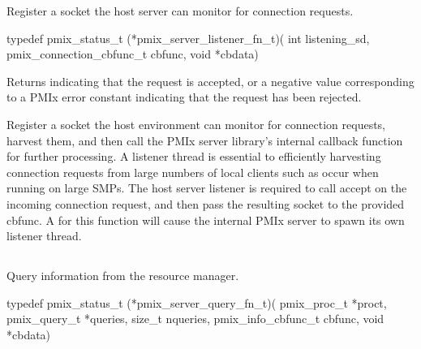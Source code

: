 Register a socket the host server can monitor for connection requests.

\format

\cspecificstart
\begin{codepar}
typedef pmix_status_t (*pmix_server_listener_fn_t)(
                             int listening_sd,
                             pmix_connection_cbfunc_t cbfunc,
                             void *cbdata)
\end{codepar}
\cspecificend

\begin{arglist}
\end{arglist}

Returns  indicating that the request is accepted, or a negative value corresponding to a PMIx error constant indicating that the request has been rejected.

\descr

Register a socket the host environment can monitor for connection requests, harvest them, and then call the \ac{PMIx} server library's internal callback function for further processing.
A listener thread is essential to efficiently harvesting connection requests from large numbers of local clients such as occur when running on large SMPs.
The host server listener is required to call accept on the incoming connection request, and then pass the resulting socket to the provided cbfunc.
A  for this function will cause the internal \ac{PMIx} server to spawn its own listener thread.


\subsection{}

\summary

Query information from the resource manager.

\format

\cspecificstart
\begin{codepar}
typedef pmix_status_t (*pmix_server_query_fn_t)(
                             pmix_proc_t *proct,
                             pmix_query_t *queries, size_t nqueries,
                             pmix_info_cbfunc_t cbfunc,
                             void *cbdata)
\end{codepar}
\cspecificend

